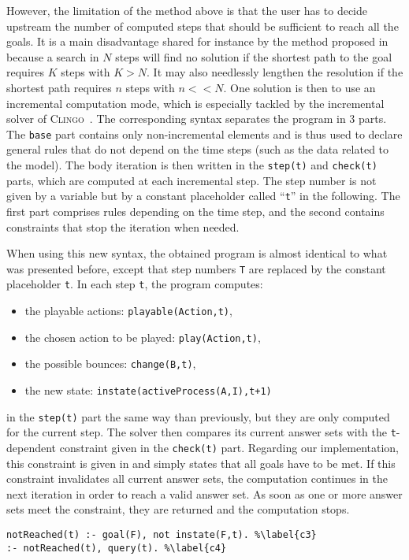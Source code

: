 
However, the limitation of the method above is that the user has to decide upstream
the number of computed steps that should be sufficient to reach all the goals.
It is a main disadvantage shared for instance by the method proposed in~\cite{roccaasp} because a search in $N$ steps will find no solution
if the shortest path to the goal requires $K$ steps with $K > N$.
It may also needlessly lengthen the resolution if the shortest path requires $n$ steps with $n << N$.
One solution is then to use an incremental computation mode,
which is especially tackled by the incremental solver of \textsc{Clingo}~\cite{gebser2008user}.
The corresponding syntax separates the program in 3 parts.
The \texttt{base} part contains only non-incremental elements
and is thus used to declare general rules
that do not depend on the time steps (such as the data related to the model).
The body iteration is then written in the
\texttt{step(t)} and \texttt{check(t)} parts,
which are computed at each incremental step. The step number is not given by a variable but by a constant placeholder called ``\texttt{t}'' in the following.
The first part comprises rules depending on the time step,
and the second contains constraints that stop the iteration when needed.

When using this new syntax, the obtained program is almost identical
to what was presented before,
except that step numbers \texttt{T}
are replaced by the constant placeholder \texttt{t}.
In each step \texttt{t}, the program computes:
\begin{itemize}\renewcommand{\labelitemi}{--}
  \item the playable actions: \texttt{playable(Action,t)},
  \item the chosen action to be played: \texttt{play(Action,t)},
  \item the possible bounces: \texttt{change(B,t)},
  \item the new state: \texttt{instate(activeProcess(A,I),t+1)}
\end{itemize}
in the \texttt{step(t)} part
the same way than previously,
but they are only computed for the current step.
The solver then compares its current answer sets with
the \texttt{t}-dependent constraint given in the \texttt{check(t)} part.
Regarding our implementation, this constraint is given in 
and simply states that all goals have to be met.
If this constraint invalidates all current answer sets,
the computation continues in the next iteration in order to reach a valid answer set.
As soon as one or more answer sets meet the constraint,
they are returned and the computation stops.
\begin{lstlisting}
notReached(t) :- goal(F), not instate(F,t). %\label{c3}
:- notReached(t), query(t). %\label{c4}
\end{lstlisting}


